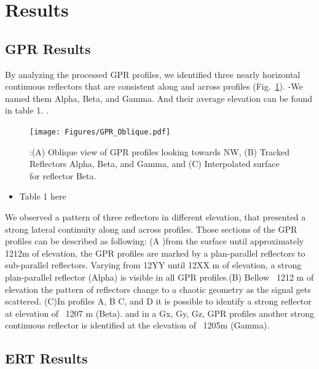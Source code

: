 \documentclass[5p]{elsarticle}
\begin{document}
 
\section{Results}




\subsection{GPR Results}

By analyzing the processed GPR profiles, we identified three nearly horizontal continuous reflectors that are consistent along and across profiles (Fig.~\ref{GPR_Oblique}). -We named them Alpha, Beta, and Gamma.  And their average elevation can be found in table 1. 
. 

								 \begin{figure}[h]

	\texttt{[image: Figures/GPR\_Oblique.pdf]}
		\caption{:(A) Oblique view of GPR profiles looking towards NW, (B) Tracked Reflectors Alpha, Beta, and Gamma, and (C) Interpolated surface for reflector Beta. \label{GPR_Oblique}}

								   \end{figure}
								   
\begin{itemize}
    \item Table 1 here
\end{itemize}			   



We observed a pattern of three reflectors in different elevation, that presented a strong lateral continuity along and across profiles. Those sections of the GPR profiles can be described as following: (A )from the surface until approximately 1212m of elevation, the GPR profiles are marked by a plan-parallel reflectors to sub-parallel reflectors. Varying from 12YY until 12XX m of elevation, a strong plan-parallel reflector (Alpha) is visible in all GPR profiles.(B) Bellow ~1212 m of elevation the pattern of reflectors change to a chaotic geometry as the signal gets scattered. (C)In profiles A, B C, and D it is possible to identify a strong reflector at elevation of ~1207 m (Beta). and in a Gx,  Gy, Gz, GPR profiles another strong continuous reflector is identified at the elevation of ~1205m (Gamma).
								   
								   
								   
\subsection{ERT Results}
\end{document}
